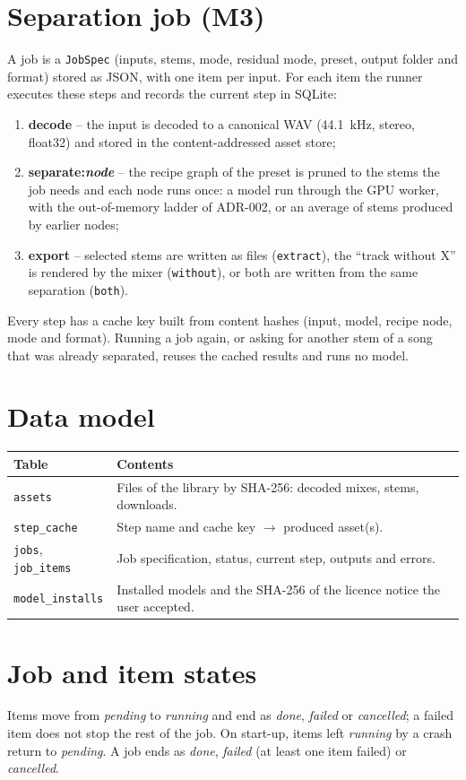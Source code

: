 \documentclass{covermaker}
\begin{document}
\section{Separation job (M3)}
A job is a \texttt{JobSpec} (inputs, stems, mode, residual mode, preset, output
folder and format) stored as JSON, with one item per input. For each item the
runner executes these steps and records the current step in SQLite:
\begin{enumerate}
  \item \textbf{decode} -- the input is decoded to a canonical WAV (44.1~kHz,
        stereo, float32) and stored in the content-addressed asset store;
  \item \textbf{separate:\textit{node}} -- the recipe graph of the preset is
        pruned to the stems the job needs and each node runs once: a model run
        through the GPU worker, with the out-of-memory ladder of ADR-002, or an
        average of stems produced by earlier nodes;
  \item \textbf{export} -- selected stems are written as files
        (\texttt{extract}), the ``track without X'' is rendered by the mixer
        (\texttt{without}), or both are written from the same separation
        (\texttt{both}).
\end{enumerate}
Every step has a cache key built from content hashes (input, model, recipe node,
mode and format). Running a job again, or asking for another stem of a song that
was already separated, reuses the cached results and runs no model.

\section{Data model}
\begin{tabularx}{\linewidth}{@{}lY@{}}
\toprule
\textbf{Table} & \textbf{Contents} \\
\midrule
\texttt{assets} & Files of the library by SHA-256: decoded mixes, stems, downloads. \\
\texttt{step\_cache} & Step name and cache key $\rightarrow$ produced asset(s). \\
\texttt{jobs}, \texttt{job\_items} & Job specification, status, current step, outputs and errors. \\
\texttt{model\_installs} & Installed models and the SHA-256 of the licence notice the user accepted. \\
\bottomrule
\end{tabularx}

\section{Job and item states}
Items move from \emph{pending} to \emph{running} and end as \emph{done},
\emph{failed} or \emph{cancelled}; a failed item does not stop the rest of the
job. On start-up, items left \emph{running} by a crash return to \emph{pending}.
A job ends as \emph{done}, \emph{failed} (at least one item failed) or
\emph{cancelled}.
\end{document}
